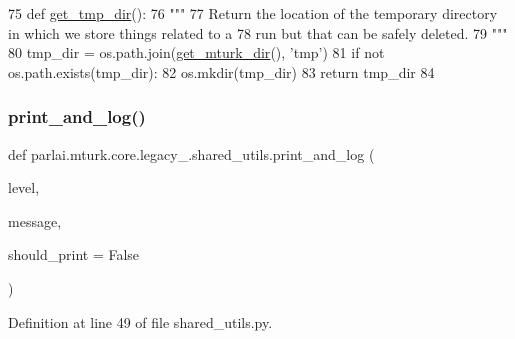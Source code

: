 \begin{DoxyCode}
75 \textcolor{keyword}{def }\hyperlink{namespaceparlai_1_1mturk_1_1core_1_1shared__utils_aa0c7ddb9db866e2f19ec6a83112fc9d2}{get\_tmp\_dir}():
76     \textcolor{stringliteral}{"""}
77 \textcolor{stringliteral}{    Return the location of the temporary directory in which we store things related to a}
78 \textcolor{stringliteral}{    run but that can be safely deleted.}
79 \textcolor{stringliteral}{    """}
80     tmp\_dir = os.path.join(\hyperlink{namespaceparlai_1_1mturk_1_1core_1_1shared__utils_aabd480fc6090e1fa769ff3926f7e842d}{get\_mturk\_dir}(), \textcolor{stringliteral}{'tmp'})
81     \textcolor{keywordflow}{if} \textcolor{keywordflow}{not} os.path.exists(tmp\_dir):
82         os.mkdir(tmp\_dir)
83     \textcolor{keywordflow}{return} tmp\_dir
84 \end{DoxyCode}
\mbox{\label{namespaceparlai_1_1mturk_1_1core_1_1legacy__2018_1_1shared__utils_a9ddd7de199560ccfb3565ebb85813c69}} 
\subsubsection{\texorpdfstring{print\+\_\+and\+\_\+log()}{print\_and\_log()}}
{\footnotesize\ttfamily def parlai.\+mturk.\+core.\+legacy\+\_.\+shared\+\_\+utils.\+print\+\_\+and\+\_\+log (\begin{DoxyParamCaption}\item[{}]{level,  }\item[{}]{message,  }\item[{}]{should\+\_\+print = {\ttfamily False} }\end{DoxyParamCaption})}



Definition at line 49 of file shared\+\_\+utils.\+py.


